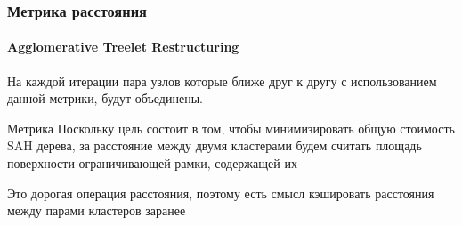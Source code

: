 \documentclass{beamer}
\begin{document}
\begin{frame}
    \frametitle{Метрика расстояния}
    \framesubtitle{Agglomerative Treelet Restructuring}
    \begin{block}{}
        На каждой итерации пара узлов
        которые ближе друг к другу с использованием данной метрики, будут объединены.
    \end{block}

    \begin{block}{Метрика}
        Поскольку цель состоит в том, чтобы минимизировать общую стоимость SAH дерева,
        за расстояние между двумя кластерами будем считать площадь поверхности
        ограничивающей рамки, содержащей их
    \end{block}

    Это дорогая операция расстояния, поэтому есть смысл кэшировать расстояния между парами кластеров
    заранее 
\end{frame}
\end{document}
